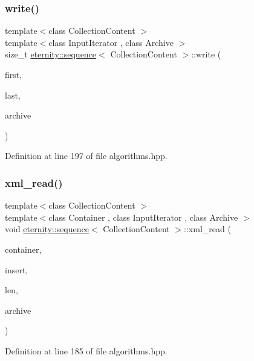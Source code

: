 \subsubsection{\texorpdfstring{write()}{write()}}
{\footnotesize\ttfamily template$<$class Collection\+Content $>$ \\
template$<$class Input\+Iterator , class Archive $>$ \\
size\+\_\+t \hyperlink{structeternity_1_1sequence}{eternity\+::sequence}$<$ Collection\+Content $>$\+::write (\begin{DoxyParamCaption}\item[{Input\+Iterator}]{first,  }\item[{Input\+Iterator}]{last,  }\item[{Archive \&}]{archive }\end{DoxyParamCaption})}



Definition at line 197 of file algorithms.\+hpp.

\mbox{\label{structeternity_1_1sequence_ae510997cf3ed034443737ca0f05e9a34}} 
\subsubsection{\texorpdfstring{xml\+\_\+read()}{xml\_read()}}
{\footnotesize\ttfamily template$<$class Collection\+Content $>$ \\
template$<$class Container , class Input\+Iterator , class Archive $>$ \\
void \hyperlink{structeternity_1_1sequence}{eternity\+::sequence}$<$ Collection\+Content $>$\+::xml\+\_\+read (\begin{DoxyParamCaption}\item[{Container \&}]{container,  }\item[{Input\+Iterator}]{insert,  }\item[{size\+\_\+t}]{len,  }\item[{Archive \&}]{archive }\end{DoxyParamCaption})}



Definition at line 185 of file algorithms.\+hpp.

\mbox{\label{structeternity_1_1sequence_a4e7cf210d285c8b3f72faa3d81ef9bad}} 
